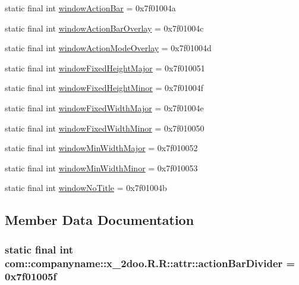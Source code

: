 \begin{CompactItemize}
\item 
static final int \hyperlink{classcom_1_1companyname_1_1x__2doo_1_1_r_1_1attr_30166d5608d3fa87b3f864f4f5048c55}{windowActionBar} = 0x7f01004a
\item 
static final int \hyperlink{classcom_1_1companyname_1_1x__2doo_1_1_r_1_1attr_863e485ff797ded1a8ec6b847ee30779}{windowActionBarOverlay} = 0x7f01004c
\item 
static final int \hyperlink{classcom_1_1companyname_1_1x__2doo_1_1_r_1_1attr_108478131ce031dafd426d3e966086a6}{windowActionModeOverlay} = 0x7f01004d
\item 
static final int \hyperlink{classcom_1_1companyname_1_1x__2doo_1_1_r_1_1attr_a910257322d4af4a914613b5f7ddd537}{windowFixedHeightMajor} = 0x7f010051
\item 
static final int \hyperlink{classcom_1_1companyname_1_1x__2doo_1_1_r_1_1attr_40bfbc676b211e152760343d6c10e4ff}{windowFixedHeightMinor} = 0x7f01004f
\item 
static final int \hyperlink{classcom_1_1companyname_1_1x__2doo_1_1_r_1_1attr_783737b734e94a569fc9c1cb433ed12e}{windowFixedWidthMajor} = 0x7f01004e
\item 
static final int \hyperlink{classcom_1_1companyname_1_1x__2doo_1_1_r_1_1attr_500cd629398e1c2f30d984a150e781e7}{windowFixedWidthMinor} = 0x7f010050
\item 
static final int \hyperlink{classcom_1_1companyname_1_1x__2doo_1_1_r_1_1attr_7a57784c7bb33cd04c80f9c559ae7df0}{windowMinWidthMajor} = 0x7f010052
\item 
static final int \hyperlink{classcom_1_1companyname_1_1x__2doo_1_1_r_1_1attr_c079db34365f9882cedca130639fb4a4}{windowMinWidthMinor} = 0x7f010053
\item 
static final int \hyperlink{classcom_1_1companyname_1_1x__2doo_1_1_r_1_1attr_bbdf5a40d5bc7d26b3742026ca6ce14c}{windowNoTitle} = 0x7f01004b
\end{CompactItemize}


\subsection{Member Data Documentation}
\hypertarget{classcom_1_1companyname_1_1x__2doo_1_1_r_1_1attr_ca109af100863f17f49bd1104f978055}{
\subsubsection[{actionBarDivider}]{\setlength{\rightskip}{0pt plus 5cm}static final int com::companyname::x\_\-2doo.R.R::attr::actionBarDivider = 0x7f01005f}}
\label{classcom_1_1companyname_1_1x__2doo_1_1_r_1_1attr_ca109af100863f17f49bd1104f978055}


